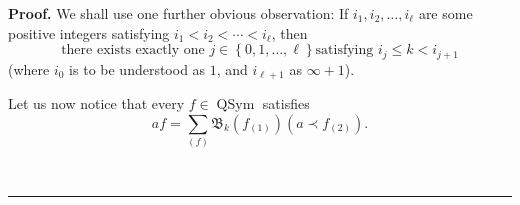 \documentclass[numbers=enddot,12pt,final,onecolumn,notitlepage,abstracton]{scrartcl}%
\theoremstyle{definition}
\newenvironment{proof}[1][Proof]{\noindent\textbf{#1.} }{\ \rule{0.5em}{0.5em}}
\newenvironment{verlong}{}{}
\let\sumnonlimits\sum
\renewcommand{\sum}{\sumnonlimits\limits}
\begin{document}
\begin{proof}
\begin{verlong}
We shall use one further obvious observation: If $i_{1},i_{2},\ldots,i_{\ell}$
are some positive integers satisfying $i_{1}<i_{2}<\cdots<i_{\ell}$, then%
\begin{equation}
\text{there exists exactly one }j\in\left\{  0,1,\ldots,\ell\right\}  \text{
satisfying }i_{j}\leq k<i_{j+1} \label{pf.thm.beldend.exactlyonej}%
\end{equation}
(where $i_{0}$ is to be understood as $1$, and $i_{\ell+1}$ as $\infty+1$).

Let us now notice that every $f\in\operatorname*{QSym}$ satisfies%
\begin{equation}
af=\sum_{\left(  f\right)  }\mathfrak{B}_{k}\left(  f_{\left(  1\right)
}\right)  \left(  a\left.  \prec\right.  f_{\left(  2\right)  }\right)  .
\label{pf.thm.beldend.mainlem}%
\end{equation}



\end{verlong}
\end{proof}
\end{document}
